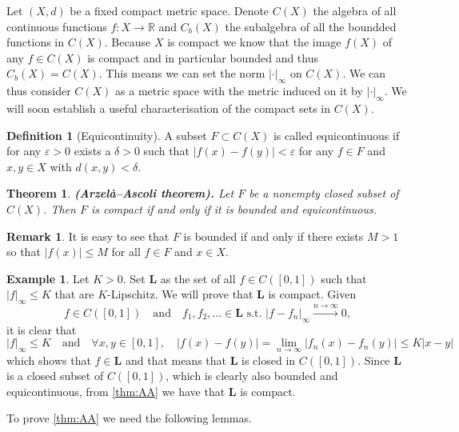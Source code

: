 \documentclass[11pt,a4paper]{article}
\theoremstyle{definition}
\newtheorem{definition}{Definition}[section]
\newtheorem{remark}{Remark}[section]
\newtheorem{example}{Example}[section]
\theoremstyle{plain}
\newtheorem{theorem}{Theorem}[section]
\newcommand{\st}{\text{ s.t. }}
\newcommand{\R}{\mathbb{R}}
\newcommand{\tand}{\quad \text{and} \quad}
\newcommand{\abs}[1]{\left\lvert #1\right\rvert}
\renewcommand{\tt}[1]{\textnormal{\textbf{(#1).}}} %
\begin{document}
  Let $(X,d)$ be a fixed compact metric space. Denote $C(X)$ the algebra
  of all continuous functions $f \colon X \to \R$ and $C_b(X)$ the
  subalgebra of all the boundded functions in $C(X)$. Because $X$
  is compact we know that the image $f(X)$ of any $f \in C(X)$ is compact
  and in particular bounded and thus $C_b(X) = C(X)$. This means we can set 
  the norm $|\cdot|_\infty$ on $C(X)$. We can thus consider $C(X)$ as
  a metric space with the metric induced on it by $|\cdot|_\infty$.
  We will soon establish a useful characterisation of the compact sets
  in $C(X)$.
  \begin{definition}[Equicontinuity]
    A subset $F \subset C(X)$ is called equicontinuous if
    for any $\varepsilon > 0$ exists a $\delta > 0$ such that
    $\abs{f(x) - f(y)} < \varepsilon$ for any $f \in F$ and $x,y \in X$ with
    $d(x,y) < \delta$.
  \end{definition}
  \begin{theorem}\label{thm:AA}
    \tt{Arzelà–Ascoli theorem} Let $F$ be a nonempty closed subset of 
    $C(X)$. Then $F$ is compact if and only if it is bounded and 
    equicontinuous.
  \end{theorem}
  \begin{remark}
    It is easy to see that $F$ is bounded if and only if there exists 
    $M > 1$ so that $|f (x)| \le M$ for all $f \in F$ and $x \in X$.
  \end{remark}
  \begin{example}
    Let $K > 0$. Set $\mathbf L$ as the set of all $f \in C([0,1])$ such that 
    $\abs{f}_{\infty} \le K$ that are $K$-Lipschitz.
    We will prove that $\mathbf L$ is compact. Given
    \[
      f \in C([0,1]) \tand f_1,f_2,\dots \in \mathbf L \st
      \abs{f - f_n}_{\infty} \xrightarrow{n \to \infty} 0,
    \]
    it is clear that
    \[
      \abs{f}_{\infty} \le K \tand \forall x,y \in [0,1], \quad
      \abs{f(x) - f(y)} =
      \lim_{n \to \infty} \abs{f_n(x) - f_n(y)} \le
      K \abs{x - y}
    \]
    which shows that $f \in \mathbf L$ and that means that $\mathbf L$ is
    closed in $C([0,1])$. Since $\mathbf L$ is a closed subset of $C([0,1])$,
    which is clearly also bounded and equicontinuous, from \autoref{thm:AA}
    we have that $\mathbf L$ is compact.
  \end{example}

  To prove \autoref{thm:AA} we need the following lemmas.
\end{document}
